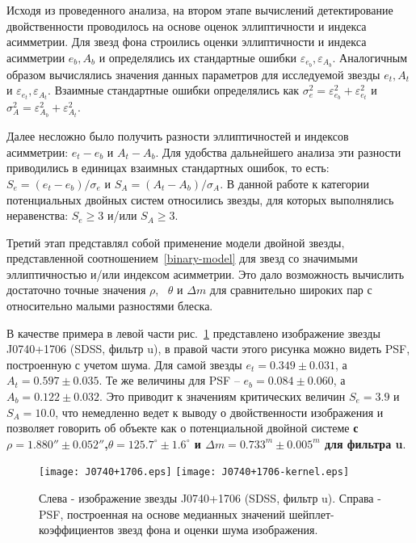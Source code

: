 Исходя из проведенного анализа, на втором этапе вычислений детектирование двойственности проводилось на основе оценок эллиптичности и индекса асимметрии. Для звезд фона строились оценки эллиптичности и индекса асимметрии $e_{b}, A_{b}$ и определялись их стандартные ошибки $\varepsilon_{e_{b}},\varepsilon_{A_{b}}$. Аналогичным образом вычислялись значения данных параметров для исследуемой звезды $e_{t}, A_{t}$ и $\varepsilon_{e_{t}},\varepsilon_{A_{t}}$. Взаимные стандартные ошибки определялись как $\sigma_e^2 = \varepsilon_{e_{b}}^2+\varepsilon_{e_{t}}^2$ и $\sigma_A^2 = \varepsilon_{A_{b}}^2+\varepsilon_{A_{t}}^2$.

Далее несложно было получить разности эллиптичностей и индексов асимметрии: $e_{t} - e_{b}$ и $A_{t} - A_{b}$. Для удобства дальнейшего анализа эти разности приводились в единицах взаимных стандартных ошибок, то есть:  $S_e = (e_{t} - e_{b})/\sigma_e$ и $S_A =(A_{t} - A_{b})/\sigma_A$. В данной работе к категории потенциальных двойных систем относились звезды, для которых выполнялись неравенства: $S_e\geq3$ и/или $S_A\geq3$.

Третий этап представлял собой применение модели двойной звезды, представленной соотношением~\ref{binary-model} для звезд со значимыми эллиптичностью и/или индексом асимметрии. Это дало возможность вычислить достаточно точные значения $\rho$,  ~$\theta$ и $\Delta m$ для сравнительно широких пар с относительно малыми разностями блеска.

В качестве примера в левой части рис.~\ref{fig:J0740+1706} представлено изображение звезды J0740+1706  (SDSS, фильтр u), в правой части этого рисунка можно видеть PSF, построенную с учетом шума. Для самой звезды $e_{t} =0.349\pm0.031$, а   $A_{t} = 0.597\pm0.035$. Те же величины для PSF -- $e_{b} =0.084\pm0.060$, а   $A_{b} =0.122\pm0.032$. Это приводит к значениям критических величин $S_e = 3.9$ и $S_A = 10.0$, что немедленно ведет к выводу о двойственности изображения и позволяет говорить об объекте как о потенциальной двойной системе \textbf{с $\rho = 1.880''\pm0.052''$,$\theta=125.7^\circ\pm1.6^\circ$ и $\Delta m= 0.733^m\pm0.005^m$ для фильтра u}.

\begin{figure}[h]
\centering
\texttt{[image: J0740+1706.eps]}
\texttt{[image: J0740+1706-kernel.eps]}
\caption{Слева - изображение звезды J0740+1706  (SDSS, фильтр u). Справа - PSF, построенная на основе медианных значений шейплет-коэффициентов звезд фона и оценки шума изображения.}
\label{fig:J0740+1706}
\end{figure}

